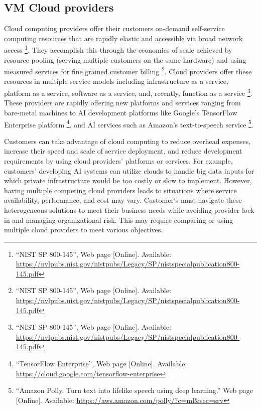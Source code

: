 
\subsection{VM Cloud providers}\label{vm-cloud-providers}

Cloud computing providers offer their customers on-demand self-service
computing resources that are rapidly elastic and accessible via broad
network access \footnote{``NIST SP 800-145'', Web page {[}Online{]}.
  Available:
  \url{https://nvlpubs.nist.gov/nistpubs/Legacy/SP/nistspecialpublication800-145.pdf}}.
They accomplish this through the economies of scale achieved by resource
pooling (serving multiple customers on the same hardware) and using
measured services for fine grained customer billing \footnote{``NIST SP
  800-145'', Web page {[}Online{]}. Available:
  \url{https://nvlpubs.nist.gov/nistpubs/Legacy/SP/nistspecialpublication800-145.pdf}}.
Cloud providers offer these resources in multiple service models
including infrastructure as a service, platform as a service, software
as a service, and, recently, function as a service \footnote{``NIST SP
  800-145'', Web page {[}Online{]}. Available:
  \url{https://nvlpubs.nist.gov/nistpubs/Legacy/SP/nistspecialpublication800-145.pdf}}.
These providers are rapidly offering new platforms and services ranging
from bare-metal machines to AI development platforms like Google's
TensorFlow Enterprise platform \footnote{``TensorFlow Enterprise'', Web
  page {[}Online{]}. Available:
  \url{https://cloud.google.com/tensorflow-enterprise}}, and AI services
such as Amazon's text-to-speech service \footnote{``Amazon Polly. Turn
  text into lifelike speech using deep learning.'' Web page
  {[}Online{]}. Available:
  \url{https://aws.amazon.com/polly/?c=ml\&sec=srv}}.

Customers can take advantage of cloud computing to reduce overhead
expenses, increase their speed and scale of service deployment, and
reduce development requirements by using cloud providers' platforms or
services. For example, customers' developing AI systems can utilize
clouds to handle big data inputs for which private infrastructure would
be too costly or slow to implement. However, having multiple competing
cloud providers leads to situations where service availability,
performance, and cost may vary. Customer's must navigate these
heterogeneous solutions to meet their business needs while avoiding
provider lock-in and managing organizational risk. This may require
comparing or using multiple cloud providers to meet various objectives.

